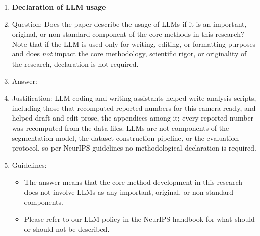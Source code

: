 \begin{enumerate}
\item {\bf Declaration of LLM usage}
    \item[] Question: Does the paper describe the usage of LLMs if it is an important, original, or non-standard component of the core methods in this research? Note that if the LLM is used only for writing, editing, or formatting purposes and does \emph{not} impact the core methodology, scientific rigor, or originality of the research, declaration is not required.
    \item[] Answer: \answerNA{}
    \item[] Justification: LLM coding and writing assistants helped write analysis scripts, including those that recomputed reported numbers for this camera-ready, and helped draft and edit prose, the appendices among it; every reported number was recomputed from the data files. LLMs are not components of the segmentation model, the dataset construction pipeline, or the evaluation protocol, so per NeurIPS guidelines no methodological declaration is required.
    \item[] Guidelines:
    \begin{itemize}
        \item The answer \answerNA{} means that the core method development in this research does not involve LLMs as any important, original, or non-standard components.
        \item Please refer to our LLM policy in the NeurIPS handbook for what should or should not be described.
    \end{itemize}

\end{enumerate}